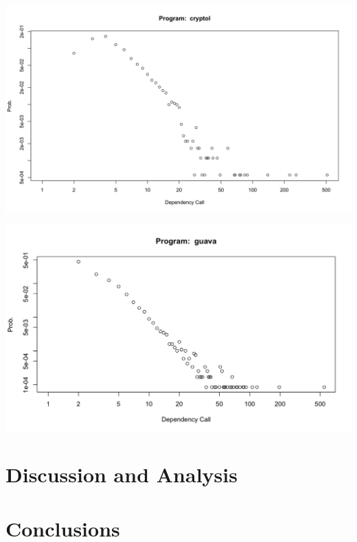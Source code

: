 \documentclass[12pt, a4paper]{article}
\begin{document}
\begin{minipage}[t]{\linewidth}
    \includegraphics[width=\textwidth]{power_law_fp.png}
    \captionsetup{type=figure}
    \label{fig:power_law_fp}
  \end{minipage}

  \begin{minipage}[t]{\linewidth}
    \includegraphics[width=\textwidth]{power_law_oop.png}
    \captionsetup{type=figure}
    \label{fig:power_law_oop}
  \end{minipage}


\section{Discussion and Analysis}
\section{Conclusions}
\end{document}
